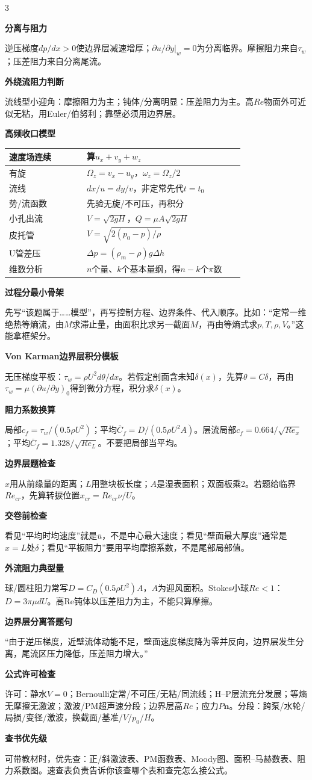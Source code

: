 \documentclass[a4paper]{article}
\newcommand{\qt}[1]{\vspace{0.25pt}\colorbox{Q}{\parbox{\dimexpr\linewidth-2\fboxsep}{\color{white}\bfseries #1}}\par}
\newcommand{\sect}[1]{\qt{#1}}
\begin{document}
\begin{multicols}{3}
{\sect{分离与阻力}
逆压梯度$dp/dx>0$使边界层减速增厚；$\partial u/\partial y|_w=0$为分离临界。摩擦阻力来自$\tau_w$；压差阻力来自分离尾流。
\sect{外绕流阻力判断}
流线型小迎角：摩擦阻力为主；钝体/分离明显：压差阻力为主。高$Re$物面外可近似无粘，用Euler/伯努利；靠壁必须用边界层。

\sect{高频收口模型}
\renewcommand{\arraystretch}{0.76}\begin{tabular}{|p{0.30\linewidth}|p{0.61\linewidth}|}
\hline 速度场连续 & 算$u_x+v_y+w_z$\\ \hline
有旋 & $\Omega_z=v_x-u_y$，$\omega_z=\Omega_z/2$\\ \hline
流线 & $dx/u=dy/v$，非定常先代$t=t_0$\\ \hline
势/流函数 & 先验无旋/不可压，再积分\\ \hline
小孔出流 & $V=\sqrt{2gH}$，$Q=\mu A\sqrt{2gH}$\\ \hline
皮托管 & $V=\sqrt{2(p_0-p)/\rho}$\\ \hline
U管差压 & $\Delta p=(\rho_m-\rho)g\Delta h$\\ \hline
维数分析 & $n$个量、$k$个基本量纲，得$n-k$个$\pi$数\\ \hline
\end{tabular}\renewcommand{\arraystretch}{1}

\sect{过程分最小骨架}
先写“该题属于……模型”，再写控制方程、边界条件、代入顺序。比如：“定常一维绝热等熵流，由$M$求滞止量，由面积比求另一截面$M$，再由等熵式求$p,T,\rho,V$。”这能拿框架分。
\sect{Von Karman边界层积分模板}
无压梯度平板：$\tau_w=\rho U^2d\theta/dx$。若假定剖面含未知$\delta(x)$，先算$\theta=C\delta$，再由$\tau_w=\mu(\partial u/\partial y)_0$得到微分方程，积分求$\delta(x)$。
\sect{阻力系数换算}
局部$c_f=\tau_w/(0.5\rho U^2)$；平均$\bar C_f=D/(0.5\rho U^2A)$。层流局部$c_f=0.664/\sqrt{Re_x}$；平均$\bar C_f=1.328/\sqrt{Re_L}$。不要把局部当平均。
\sect{边界层题检查}
$x$用从前缘量的距离；$L$用整块板长度；$A$是湿表面积；双面板乘2。若题给临界$Re_{cr}$，先算转捩位置$x_{cr}=Re_{cr}\nu/U$。
\sect{交卷前检查}
看见“平均时均速度”就是$\bar u$，不是中心最大速度；看见“壁面最大厚度”通常是$x=L$处$\delta$；看见“平板阻力”要用平均摩擦系数，不是尾部局部值。
\sect{外流阻力典型量}
球/圆柱阻力常写$D=C_D(0.5\rho U^2)A$，$A$为迎风面积。Stokes小球$Re<1$：$D=3\pi\mu dU$。高Re钝体以压差阻力为主，不能只算摩擦。
\sect{边界层分离答题句}
“由于逆压梯度，近壁流体动能不足，壁面速度梯度降为零并反向，边界层发生分离，尾流区压力降低，压差阻力增大。”
\sect{公式许可检查}
许可：静水$V=0$；Bernoulli定常/不可压/无粘/同流线；H--P层流充分发展；等熵无摩擦无激波；激波/PM超声速分段；边界层高$Re$；应力$P\bm n$。分段：跨泵/水轮/局损/变径/激波，换截面/基准/$V$/$p_0$/$H$。
\sect{查书优先级}
可带教材时，优先查：正/斜激波表、PM函数表、Moody图、面积--马赫数表、阻力系数图。速查表负责告诉你该查哪个表和查完怎么接公式。

}
\end{multicols}
\end{document}
